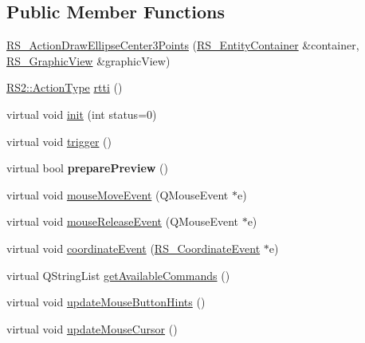 \subsection*{Public Member Functions}
\begin{DoxyCompactItemize}
\item 
\hyperlink{classRS__ActionDrawEllipseCenter3Points_a721e1e2a5e98f2501bcd1f2cef47062e}{R\-S\-\_\-\-Action\-Draw\-Ellipse\-Center3\-Points} (\hyperlink{classRS__EntityContainer}{R\-S\-\_\-\-Entity\-Container} \&container, \hyperlink{classRS__GraphicView}{R\-S\-\_\-\-Graphic\-View} \&graphic\-View)
\item 
\hyperlink{classRS2_afe3523e0bc41fd637b892321cfc4b9d7}{R\-S2\-::\-Action\-Type} \hyperlink{classRS__ActionDrawEllipseCenter3Points_a27b847d2b2f74dccc402a92d93113147}{rtti} ()
\item 
virtual void \hyperlink{classRS__ActionDrawEllipseCenter3Points_a9b1210baec29dc2f997dade3f2e7ae6b}{init} (int status=0)
\item 
virtual void \hyperlink{classRS__ActionDrawEllipseCenter3Points_a968b709f851502576a44cc5e216c47c5}{trigger} ()
\item 
\hypertarget{classRS__ActionDrawEllipseCenter3Points_a210b715505c07d2a2e70421d0f7b06cb}{virtual bool {\bfseries prepare\-Preview} ()}\label{classRS__ActionDrawEllipseCenter3Points_a210b715505c07d2a2e70421d0f7b06cb}

\item 
virtual void \hyperlink{classRS__ActionDrawEllipseCenter3Points_a1425ef90f1ae08d27e2b07a284490552}{mouse\-Move\-Event} (Q\-Mouse\-Event $\ast$e)
\item 
virtual void \hyperlink{classRS__ActionDrawEllipseCenter3Points_af5a8bf290866f3b2c0606b4d4d49bd87}{mouse\-Release\-Event} (Q\-Mouse\-Event $\ast$e)
\item 
virtual void \hyperlink{classRS__ActionDrawEllipseCenter3Points_afc6efc5b2f7c45a8e2e47a3d428cab35}{coordinate\-Event} (\hyperlink{classRS__CoordinateEvent}{R\-S\-\_\-\-Coordinate\-Event} $\ast$e)
\item 
virtual Q\-String\-List \hyperlink{classRS__ActionDrawEllipseCenter3Points_ab95399dc47c67211f81ff85b8be1294a}{get\-Available\-Commands} ()
\item 
virtual void \hyperlink{classRS__ActionDrawEllipseCenter3Points_acca2d7fb7d405cdfb3ae3c995ddbb561}{update\-Mouse\-Button\-Hints} ()
\item 
virtual void \hyperlink{classRS__ActionDrawEllipseCenter3Points_abecf8c0be5daaa80dd9691d02b8dfeca}{update\-Mouse\-Cursor} ()
\end{DoxyCompactItemize}
